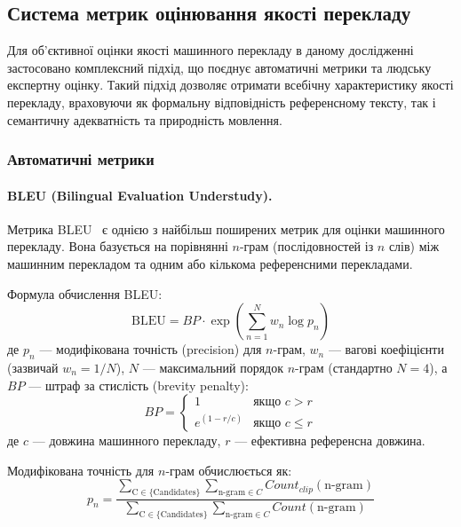 \subsection{Система метрик оцінювання якості перекладу}
\label{subsec:metrics}

Для об'єктивної оцінки якості машинного перекладу в даному дослідженні
застосовано комплексний підхід, що поєднує автоматичні метрики та людську
експертну оцінку. Такий підхід дозволяє отримати всебічну характеристику
якості перекладу, враховуючи як формальну відповідність референсному тексту,
так і семантичну адекватність та природність мовлення.

\subsubsection{Автоматичні метрики}

\paragraph{BLEU (Bilingual Evaluation Understudy).}
Метрика BLEU~\cite{papineni_bleu} є однією з найбільш поширених метрик для
оцінки машинного перекладу. Вона базується на порівнянні $n$-грам
(послідовностей із $n$ слів) між машинним перекладом та одним або кількома
референсними перекладами.

Формула обчислення BLEU:
\begin{equation}
\text{BLEU} = BP \cdot \exp\left(\sum_{n=1}^{N} w_n \log p_n\right)
\end{equation}
де $p_n$ — модифікована точність (precision) для $n$-грам, $w_n$ — вагові
коефіцієнти (зазвичай $w_n = 1/N$), $N$ — максимальний порядок $n$-грам
(стандартно $N = 4$), а $BP$ — штраф за стислість (brevity penalty):
\begin{equation}
BP = \begin{cases}
1 & \text{якщо } c > r \\
e^{(1 - r/c)} & \text{якщо } c \leq r
\end{cases}
\end{equation}
де $c$ — довжина машинного перекладу, $r$ — ефективна референсна довжина.

Модифікована точність для $n$-грам обчислюється як:
\begin{equation}
p_n = \frac{\sum_{\text{C} \in \{\text{Candidates}\}} \sum_{\text{n-gram} \in C} Count_{clip}(\text{n-gram})}{\sum_{\text{C} \in \{\text{Candidates}\}} \sum_{\text{n-gram} \in C} Count(\text{n-gram})}
\end{equation}

